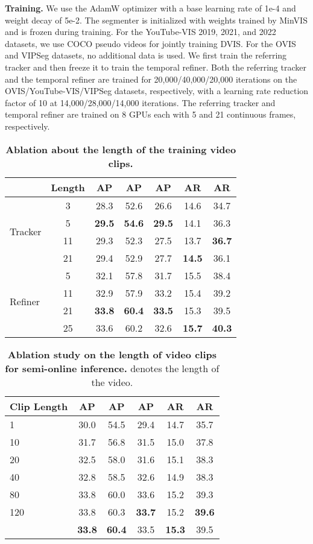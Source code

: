 \documentclass[10pt,twocolumn,letterpaper]{article}
\begin{document}
\textbf{Training.} We use the AdamW optimizer \cite{adamw} with a base learning rate of 1e-4 and weight decay of 5e-2. The segmenter is initialized with weights trained by MinVIS \cite{minvis} and is frozen during training. For the YouTube-VIS 2019, 2021, and 2022 datasets, we use COCO pseudo videos \cite{seqformer} for jointly training DVIS. For the OVIS and VIPSeg datasets, no additional data is used. We first train the referring tracker and then freeze it to train the temporal refiner. Both the referring tracker and the temporal refiner are trained for 20,000/40,000/20,000 iterations on the OVIS/YouTube-VIS/VIPSeg datasets, respectively, with a learning rate reduction factor of 10 at 14,000/28,000/14,000 iterations. The referring tracker and temporal refiner are trained on 8 GPUs each with 5 and 21 continuous frames, respectively.

\begin{table}[t]
\centering
\setlength{\tabcolsep}{1.8mm}
\begin{tabular}{l|c|ccccc}
	~ & Length & AP &  AP & AP & AR & AR  \\
	\hline
	\multirow{4}{*}{Tracker} & 3 & 28.3 & 52.6 & 26.6 & 14.6 & 34.7 \\
	~ & 5 & \textbf{29.5} & \textbf{54.6} & \textbf{29.5} & 14.1 & 36.3 \\
	~ & 11 & 29.3 & 52.3 & 27.5 & 13.7 & \textbf{36.7} \\
	~ & 21 & 29.4 & 52.9 & 27.7 & \textbf{14.5} & 36.1 \\
	\hline
	\multirow{4}{*}{Refiner} & 5 & 32.1 & 57.8 & 31.7 & 15.5 & 38.4 \\
	~ & 11 & 32.9 & 57.9 & 33.2 & 15.4 & 39.2 \\
	~ & 21 & \textbf{33.8} & \textbf{60.4} & \textbf{33.5} & 15.3 & 39.5 \\
	~ & 25 & 33.6 & 60.2 & 32.6 & \textbf{15.7} & \textbf{40.3}\\
\hline
 \end{tabular}
 \caption{\textbf{Ablation about the length of the training video clips.}}
 \label{tab:training length}
\end{table}

\begin{table}[t]
\centering
\begin{tabular}{l|ccccc}
	Clip Length & AP &  AP & AP & AR & AR  \\
	\hline
	1 & 30.0 & 54.5 & 29.4 & 14.7 & 35.7 \\
	10 & 31.7 & 56.8 & 31.5 & 15.0 & 37.8 \\
	20 & 32.5 & 58.0 & 31.6 & 15.1 & 38.3 \\
	40 & 32.8 & 58.5 & 32.6 & 14.9 & 38.3 \\
	80 & 33.8 & 60.0 & 33.6 & 15.2 & 39.3 \\
 	120 & 33.8 & 60.3 & \textbf{33.7} & 15.2 & \textbf{39.6} \\
	 & \textbf{33.8} & \textbf{60.4} & 33.5 & \textbf{15.3} & 39.5 \\
\hline
 \end{tabular}
 \caption{\textbf{Ablation study on the length of video clips for semi-online inference.}  denotes the length of the video.}
 \label{tab:clip length}
\end{table}
\end{document}

